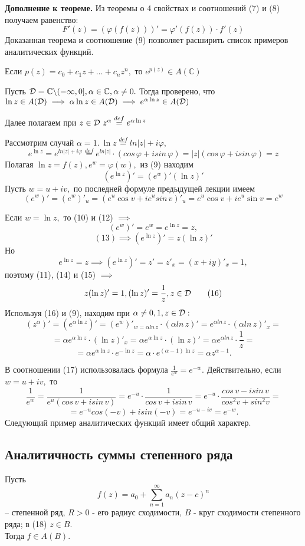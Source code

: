 \documentclass[main]{subfiles}
\begin{document}
\textbf{Дополнение к теореме.} Из теоремы о 4 свойствах и соотношений (7) и (8) получаем равенство:
\[ F'(z)=(\varphi(f(z)))'=\varphi'(f(z))\cdot f'(z)\tag{9} \]
Доказанная теорема и соотношение (9) позволяет расширить список примеров аналитических функций.

Если $p(z)=c_0+c_1z+\dots+c_nz^n,$ то $e^{p(z)}\in A(\mathbb{C})$

Пусть $\mathcal{D}=\mathbb{C}\backslash(-\infty,0], \alpha\in\mathbb{C},\alpha\neq 0.$ Тогда проверено, что $\ln z\in A(\mathcal{D})\implies \alpha \ln z\in A(\mathcal{D})\implies e^{\alpha \ln z}\in A(\mathcal{D})$

Далее полагаем при $z\in\D\ z^\alpha\overset{def}{=} e^{\alpha \ln z}$

Рассмотрим случай $\alpha=1.\ \ln z\overset{def}{=}ln|z|+i\varphi$,
\[ e^{\ln z}=e^{ln|z|+i\varphi}\overset{def}{=}e^{ln|z|}\cdot(cos\,\varphi+isin\,\varphi)=|z|(cos\,\varphi+isin\,\varphi)=z\tag{10} \]
Полагая $\ln z=f(z), e^w=\varphi(w),$ из (9) находим \[ (e^{\ln z})'=(e^w)'(\ln z)'\tag{11} \]
Пусть $w=u+iv,$ по последней формуле предыдущей лекции имеем
\[ (e^w)'=(e^w)'_u=(e^u \cos v+ie^usin\,v)'_u=e^u \cos v+ie^u \sin v=e^w\tag{12} \]

Если $w=\ln z,$ то (10) и (12) $\implies$
\[ (e^w)'=e^w=e^{\ln z}=z,\tag{13} \]
\[(13)\implies (e^{\ln z})'=z(\ln z)'\tag{14}\]
Но \[e^{\ln z}=z\implies (e^{\ln z})'=z'=z'_x=(x+iy)'_x=1,\tag{15}\]
поэтому (11), (14) и (15) $\implies$\[ z(\ln z)'=1 , (\ln z)'=\frac{1}{z}, z\in\mathcal{D}\tag{16}\]
Используя (16) и (9), находим при $\alpha\neq 0, 1, z\in\mathcal{D}:$
\[ (z^\alpha)'=(e^{\alpha \ln z})'=(e^w)'_{w=\alpha ln\, z}\cdot (\alpha ln\, z)'=e^{\alpha ln\, z}\cdot (\alpha ln\, z)'_x= \]
\[ =\alpha e^{\alpha \ln z}\cdot(\ln z)'_x=\alpha e^{\alpha \ln z}\cdot(\ln z)'=\alpha e^{\alpha ln\, z}\cdot\frac{1}{z}= \]
\[=\alpha e^{\alpha \ln z}\cdot e^{-\ln z}=\alpha\cdot e^{(\alpha-1)\ln z}=\alpha z^{\alpha-1}.\tag{17} \]

В соотношении (17) использовалась формула $\frac{1}{e^w}=e^{-w}.$ Действительно, если $w=u+iv,$ то \[\frac{1}{e^w}=\frac{1}{e^u(cos\,v+isin\,v)}=e^{-u}\cdot\frac{1}{cos\,v+isin\,v}=e^{-u}\cdot\frac{cos\,v-isin\,v}{cos^2v+sin^2v}=\]
\[ =e^{-u}cos(-v)+isin(-v)=e^{-u-iv}=e^{-w}. \]
Следующий пример аналитических функций имеет общий характер.

\subsection{Аналитичность суммы степенного ряда}
\begin{theorem} Пусть \[f(z)=a_0+\sum\limits_{n=1}^\infty a_n(z-c)^n\tag{18}\]
    -- степенной ряд, $R>0$ - его радиус сходимости, $B$ - круг сходимости степенного ряда;
     в (18) $z\in B.$\\
Тогда $f\in A(B).$
\end{theorem}
\end{document}

